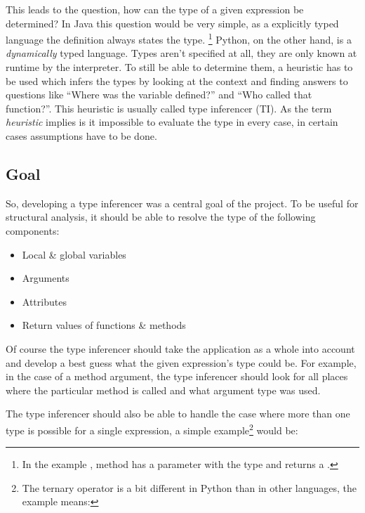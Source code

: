 \documentclass[12pt,halfparskip,DIV11,BCOR10mm]{scrreprt}
\begin{document}

This leads to the question, how can the type of a given expression be determined? In Java this question would be very simple, as a explicitly typed language the definition always states the type.
\footnote{In the example , method  has a parameter  with the type  and returns a .} Python, on the other hand, is a \emph{dynamically} typed language. Types aren't specified at all, they are only known at runtime by the interpreter. To still be able to determine them, a heuristic has to be used which infers the types by looking at the context and finding answers to questions like ``Where was the variable defined?'' and ``Who called that function?''. This heuristic is usually called type inferencer (TI). As the term \emph{heuristic} implies is it impossible to evaluate the type in every case, in certain cases assumptions have to be done.


\subsection{Goal}

So, developing a type inferencer was a central goal of the project. To be useful for structural analysis, it should be able to resolve the type of the following components:

\begin{itemize}
    \item Local \& global variables
    \item Arguments
    \item Attributes
    \item Return values of functions \& methods
\end{itemize}

Of course the type inferencer should take the application as a whole into account and develop a best guess what the given expression's type could be. For example, in the case of a method argument, the type inferencer should look for all places where the particular method is called and what argument type was used.

The type inferencer should also be able to handle the case where more than one type is possible for a single expression, a simple example\footnote{The ternary operator is a bit different in Python than in other languages, the example means: } would be:
\end{document}
